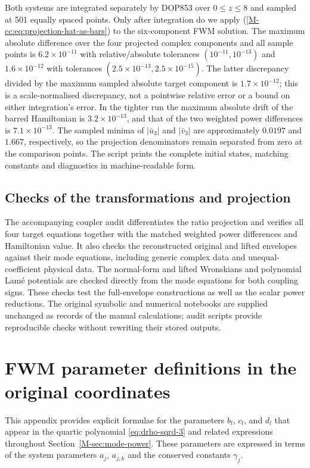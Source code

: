 \documentclass[11pt,a4paper]{article}
\newcommand{\externaleqref}[1]{\textup{(\ref*{#1})}}
\begin{document}
Both systems are integrated separately by DOP853 over $0\le z\le8$ and sampled at 501 equally spaced points.
Only after integration do we apply \externaleqref{M-cc:eq:projection-hat-as-bars} to the six-component FWM solution.
The maximum absolute difference over the four projected complex components and all sample points is $6.2\times10^{-11}$ with relative/absolute tolerances $(10^{-11},10^{-13})$ and $1.6\times10^{-12}$ with tolerances $(2.5\times10^{-13},2.5\times10^{-15})$.
The latter discrepancy divided by the maximum sampled absolute target component is $1.7\times10^{-12}$; this is a scale-normalised discrepancy, not a pointwise relative error or a bound on either integration's error.
In the tighter run the maximum absolute drift of the barred Hamiltonian is $3.2\times10^{-13}$, and that of the two weighted power differences is $7.1\times10^{-13}$.
The sampled minima of $|\bar u_3|$ and $|\bar v_3|$ are approximately $0.0197$ and $1.667$, respectively, so the projection denominators remain separated from zero at the comparison points.
The script prints the complete initial states, matching constants and diagnostics in machine-readable form.

\subsection{Checks of the transformations and projection}
The accompanying coupler audit differentiates the ratio projection and verifies all four target equations together with the matched weighted power differences and Hamiltonian value.
It also checks the reconstructed original and lifted envelopes against their mode equations, including generic complex data and unequal-coefficient physical data.
The normal-form and lifted Wronskians and polynomial Lam\'e potentials are checked directly from the mode equations for both coupling signs.
These checks test the full-envelope constructions as well as the scalar power reductions.
The original symbolic and numerical notebooks are supplied unchanged as records of the manual calculations; audit scripts provide reproducible checks without rewriting their stored outputs.

\FloatBarrier

\section{FWM parameter definitions in the original coordinates}
\label{app:param-def-appendix}

This appendix provides explicit formulae for the parameters $b_l$, $c_l$, and $d_l$ that appear in the quartic polynomial \eqref{eq:drho-sqrd-3} and related expressions throughout Section~\ref*{M-sec:mode-power}.
These parameters are expressed in terms of the system parameters $a_j$, $a_{j,k}$ and the conserved constants $\gamma_j$.
\end{document}
